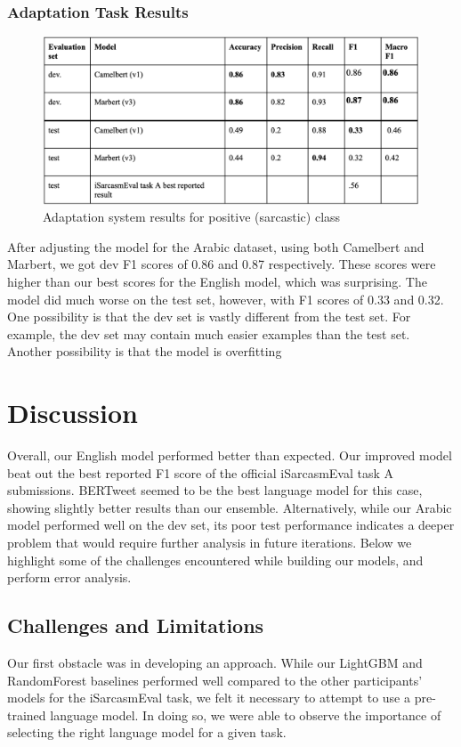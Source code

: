 \documentclass[11pt]{article}
\begin{document}
\subsubsection{Adaptation Task Results}
\begin{figure}[h!]
    \includegraphics[width=.5\textwidth]{Adaptation system results for positive (sarcastic) class.png}
    \caption{Adaptation system results for positive (sarcastic) class}
\end{figure}

After adjusting the model for the Arabic dataset, using both Camelbert and Marbert, we got dev F1 scores of 0.86 and 0.87 respectively. These scores were higher than our best scores for the English model, which was surprising. The model did much worse on the test set, however, with F1 scores of 0.33 and 0.32. One possibility is that the dev set is vastly different from the test set. For example, the dev set may contain much easier examples than the test set. Another possibility is that the model is overfitting

\section{Discussion}

Overall, our English model performed better than expected. Our improved model beat out the best reported F1 score of the official iSarcasmEval task A submissions. BERTweet seemed to be the best language model for this case, showing slightly better results than our ensemble. Alternatively, while our Arabic model performed well on the dev set, its poor test performance indicates a deeper problem that would require further analysis in future iterations. Below we highlight some of the challenges encountered while building our models, and perform error analysis. 

\subsection{Challenges and Limitations}
Our first obstacle was in developing an approach. While our LightGBM and RandomForest baselines performed well compared to the other participants’ models for the iSarcasmEval task, we felt it necessary to attempt to use a pre-trained language model. In doing so, we were able to observe the importance of selecting the right language model for a given task. 
\end{document}
